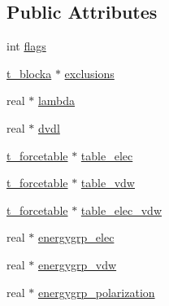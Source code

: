 \subsection*{\-Public \-Attributes}
\begin{DoxyCompactItemize}
\item 
int \hyperlink{structnb__kernel__data__t_a4be453b607bd6430bf1005f696dd6080}{flags}
\item 
\hyperlink{structt__blocka}{t\-\_\-blocka} $\ast$ \hyperlink{structnb__kernel__data__t_a6e1874d62a04127f4a91977bbe49f4a8}{exclusions}
\item 
real $\ast$ \hyperlink{structnb__kernel__data__t_ad5f245695f0839d90064113287f2bdb2}{lambda}
\item 
real $\ast$ \hyperlink{structnb__kernel__data__t_a7a5c80a5a255c88f07e8f8ca5f5e5db3}{dvdl}
\item 
\hyperlink{structt__forcetable}{t\-\_\-forcetable} $\ast$ \hyperlink{structnb__kernel__data__t_a838593afcbe4611e1ef977b93a4e2010}{table\-\_\-elec}
\item 
\hyperlink{structt__forcetable}{t\-\_\-forcetable} $\ast$ \hyperlink{structnb__kernel__data__t_ab73c8647653de8e9ae8804982bcec0f9}{table\-\_\-vdw}
\item 
\hyperlink{structt__forcetable}{t\-\_\-forcetable} $\ast$ \hyperlink{structnb__kernel__data__t_ab6eacf5fd1f6614f6d496b962332a33d}{table\-\_\-elec\-\_\-vdw}
\item 
real $\ast$ \hyperlink{structnb__kernel__data__t_ac53b1520ed8908e9bd2f0b375dd57705}{energygrp\-\_\-elec}
\item 
real $\ast$ \hyperlink{structnb__kernel__data__t_adacaa5558e060d6baa3dcd13b0bf4311}{energygrp\-\_\-vdw}
\item 
real $\ast$ \hyperlink{structnb__kernel__data__t_ae36e440f86a7dbedf1dbb536536dc16b}{energygrp\-\_\-polarization}
\end{DoxyCompactItemize}



